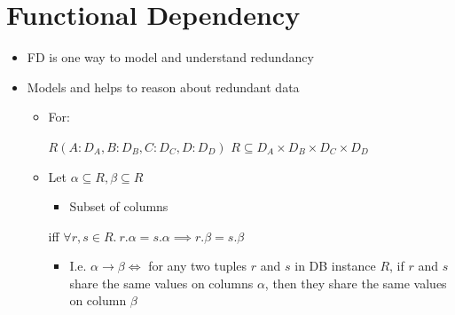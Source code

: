 
\section{Functional Dependency}
\begin{itemize}
        \begin{itemize}
            \item Keep same data in multiple relations and/or multiple tuples
            \icon Waste of storage space
            \icon Additional work to keep consistent
                \begin{itemize}
                    \item Else we get anomalies
                \end{itemize}
            \icon Hard to keep consistent
            \icon Additional code to keep consistent
            \ipro Improve locality
            \ipro Better performance
            \ipro Fault tolerance
            \ipro Availability
        \end{itemize}
    \item FD is one way to model and understand redundancy
    \item Models and helps to reason about redundant data
        \begin{itemize}
            \item For:
                \begin{itemize}
                     $R(A:D_A, B:D_B, C:D_C, D:D_D)$
                     $R \subseteq D_A \times D_B \times D_C \times D_D$
                \end{itemize}
            \item Let $\alpha \subseteq R, \beta \subseteq R$
                \begin{itemize}
                    \item Subset of columns
                \end{itemize}
                 iff $\forall r, s \in R.\ r.\alpha = s.\alpha \implies r.\beta = s.\beta$
                    \begin{itemize}
                        \item I.e. $\alpha \to \beta \iff$ for any two tuples $r$ and $s$ in DB instance $R$, if $r$ and $s$ share the same values on columns $\alpha$, then they share the same values on column $\beta$

\end{itemize}
\end{itemize}
\end{itemize}
